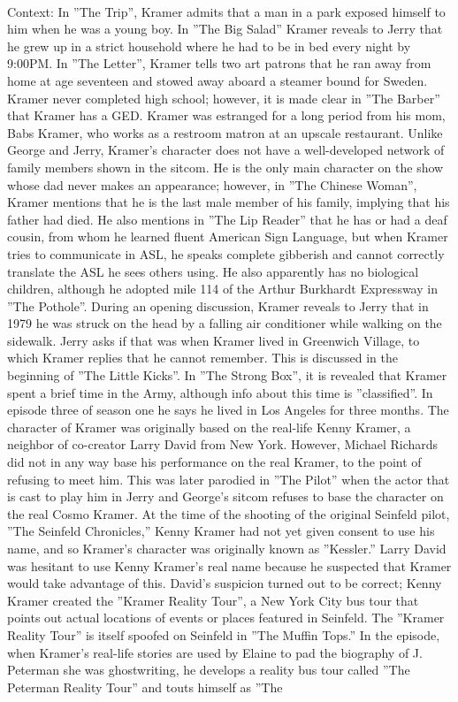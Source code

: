 \documentclass[11pt,a4paper, onecolumn]{article}
\begin{document}
\\ Context: In ''The Trip'', Kramer admits that a man in a park exposed himself to him when he was a young boy. In ''The Big Salad'' Kramer reveals to Jerry that he grew up in a strict household where he had to be in bed every night by 9:00PM. In ''The Letter'', Kramer tells two art patrons that he ran away from home at age seventeen and stowed away aboard a steamer bound for Sweden. Kramer never completed high school; however, it is made clear in ''The Barber'' that Kramer has a GED. Kramer was estranged for a long period from his mom, Babs Kramer, who works as a restroom matron at an upscale restaurant. Unlike George and Jerry, Kramer's character does not have a well-developed network of family members shown in the sitcom. He is the only main character on the show whose dad never makes an appearance; however, in ''The Chinese Woman'', Kramer mentions that he is the last male member of his family, implying that his father had died. He also mentions in ''The Lip Reader'' that he has or had a deaf cousin, from whom he learned fluent American Sign Language, but when Kramer tries to communicate in ASL, he speaks complete gibberish and cannot correctly translate the ASL he sees others using. He also apparently has no biological children, although he adopted mile 114 of the Arthur Burkhardt Expressway in ''The Pothole''. During an opening discussion, Kramer reveals to Jerry that in 1979 he was struck on the head by a falling air conditioner while walking on the sidewalk. Jerry asks if that was when Kramer lived in Greenwich Village, to which Kramer replies that he cannot remember. This is discussed in the beginning of ''The Little Kicks''. In ''The Strong Box'', it is revealed that Kramer spent a brief time in the Army, although info about this time is ''classified''. In episode three of season one he says he lived in Los Angeles for three months. The character of Kramer was originally based on the real-life Kenny Kramer, a neighbor of co-creator Larry David from New York. However, Michael Richards did not in any way base his performance on the real Kramer, to the point of refusing to meet him. This was later parodied in ''The Pilot'' when the actor that is cast to play him in Jerry and George's sitcom refuses to base the character on the real Cosmo Kramer. At the time of the shooting of the original Seinfeld pilot, ''The Seinfeld Chronicles,'' Kenny Kramer had not yet given consent to use his name, and so Kramer's character was originally known as ''Kessler.'' Larry David was hesitant to use Kenny Kramer's real name because he suspected that Kramer would take advantage of this. David's suspicion turned out to be correct; Kenny Kramer created the ''Kramer Reality Tour'', a New York City bus tour that points out actual locations of events or places featured in Seinfeld. The ''Kramer Reality Tour'' is itself spoofed on Seinfeld in ''The Muffin Tops.'' In the episode, when Kramer's real-life stories are used by Elaine to pad the biography of J. Peterman she was ghostwriting, he develops a reality bus tour called ''The Peterman Reality Tour'' and touts himself as ''The 
\end{document}
